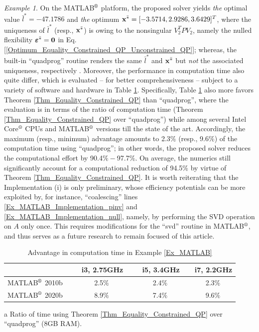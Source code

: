 \documentclass[9pt,twocolumn,twoside,lineno]{pnas-new-1}
\newcommand{\bfx}{{\bf x}}
\newcommand{\bfvarepsilon}{{\boldsymbol \varepsilon}}
\newcommand{\bfzero}{{\bf 0}}
\theoremstyle{remark}
\newtheorem{example}{Example}[section]
\begin{document}
\begin{example}
On the MATLAB$\textsuperscript{\textregistered}$ platform, the proposed solver yields \textit{the} optimal value $\bar l^*=-47.1786$ and \textit{the} optimum $\bfx^{\bar *}=[-3.5714,2.9286,3.6429]^T$, where the uniqueness of $\bar l^*$ (resp., $\bfx^{\bar *}$) is owing to the nonsingular $V_2^TPV_2$, namely the nulled flexibility $\bfvarepsilon^{\bar *}=\bfzero$ in Eq. [\ref{Optimum_Equality_Constrained_QP_Unconstrained_QP}]; whereas, the built-in ``quadprog'' routine renders the same $\bar l^*$ and $\bfx^{\bar *}$ but \textit{not} the associated uniqueness, respectively \cite{MATLAB}. Moreover, the performance in computation time also quite differ, which is evaluated -- for better comprehensiveness -- subject to a variety of software and hardware in Table \ref{Table_Ex_MATLAB}. Specifically, Table \ref{Table_Ex_MATLAB} also more favors Theorem \ref{Thm_Equality_Constrained_QP} than ``quadprog'', where the evaluation is in terms of the ratio of computation time (Theorem \ref{Thm_Equality_Constrained_QP} over ``quadprog'') while among several Intel Core$\textsuperscript{\textregistered}$ CPUs and MATLAB$\textsuperscript{\textregistered}$ versions till the state of the art. Accordingly, the maximum (resp., minimum) advantage amounts to 2.3$\%$ (resp., 9.6$\%$) of the computation time using ``quadprog''; in other words, the proposed solver reduces the computational effort by 90.4$\%-$97.7$\%$. On average, the numerics still significantly account for a computational reduction of 94.5$\%$ by virtue of Theorem \ref{Thm_Equality_Constrained_QP}. It is worth reiterating that the Implementation (i) is only preliminary, whose efficiency potentials can be more exploited by, for instance, ``coalescing'' lines \ref{Ex_MATLAB_Implementation_pinv} and \ref{Ex_MATLAB_Implementation_null}, namely, by performing the SVD operation on $A$ only once. This requires modifications for the ``svd'' routine in MATLAB$\textsuperscript{\textregistered}$, and thus serves as a future research to remain focused of this article.

\begin{table}[htbp]
\centering
\begin{threeparttable}[htbp]
\caption{Advantage in computation time in Example {\rm\ref{Ex_MATLAB}}}
\renewcommand{\arraystretch}{1.5}
\begin{tabular}{l c c c}
\hline
 & ~~~i3, 2.75GHz & ~~~i5, 3.4GHz & ~~i7, 2.2GHz \\ \hline
MATLAB$\textsuperscript{\textregistered}$ 2010b & ~~~2.5$\%$ & ~~~2.4$\%$ & ~~2.3$\%$ \\
MATLAB$\textsuperscript{\textregistered}$ 2020b & ~~~8.9$\%$ & ~~~7.4$\%$ & ~~9.6$\%$ \\ \hline
\end{tabular}
\begin{tablenotes}
\item [a] Ratio of time using Theorem \ref{Thm_Equality_Constrained_QP} over ``quadprog'' (8GB RAM).
\end{tablenotes}
\label{Table_Ex_MATLAB}
\end{threeparttable}
\end{table}


\end{example}
\end{document}
